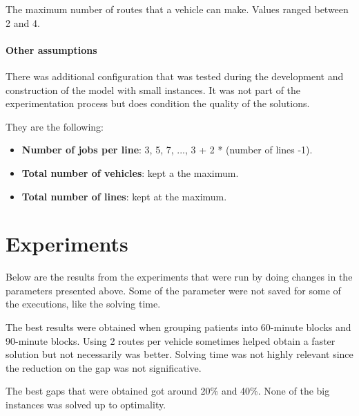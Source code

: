 The maximum number of routes that a vehicle can make. Values ranged between 2 and 4.

\paragraph{Other assumptions}

There was additional configuration that was tested during the development and construction of the model with small instances. It was not part of the experimentation process but does condition the quality of the solutions.

They are the following:

\begin{itemize}
	\item \textbf{Number of jobs per line}: 3, 5, 7, ..., 3 + 2 * (number of lines -1).
	\item \textbf{Total number of vehicles}: kept a the maximum.
	\item \textbf{Total number of lines}: kept at the maximum.
\end{itemize}

\section{Experiments}

Below are the results from the experiments that were run by doing changes in the parameters presented above.
Some of the parameter were not saved for some of the executions, like the solving time.


The best results were obtained when grouping patients into 60-minute blocks and 90-minute blocks. Using 2 routes per vehicle sometimes helped obtain a faster solution but not necessarily was better. Solving time was not highly relevant since the reduction on the gap was not significative.


The best gaps that were obtained got around 20\% and 40\%. None of the big instances was solved up to optimality.

